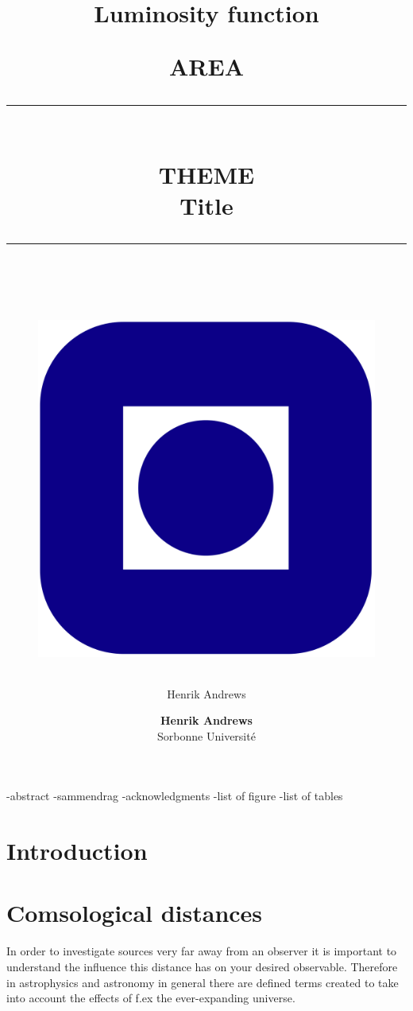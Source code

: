 \documentclass[11pt]{article}
\title{Luminosity function}
\author{Henrik Andrews}
\newcommand{\HRule}[1]{\rule{\linewidth}{#1}}
\begin{document}
\title{ \normalsize \textsc{AREA}
	\\ [2.0cm]
	\HRule{0.5pt} \\
	\LARGE \textbf{\uppercase{Theme}}		
	\\ Title\\
	\HRule{2pt} \\ [0.5cm]		
	\vspace{6cm}
	\begin{figure}[htp]
    \centering
    \includegraphics[width=.2\textwidth]{Logo-Ntnu.svg.png}
    \end{figure}
	}

\author{
    \normalsize 
	\textbf{Henrik Andrews } \\
	Sorbonne Université \\ 
}

\maketitle
\setcounter{page}{ 0 }

\newpage

\pagestyle{fancy}
\fancyhf{}
\setlength\headheight{12pt}
\setcounter{page}{1}


\maketitle
-abstract 
-sammendrag
-acknowledgments
-list of figure
-list of tables


\section{Introduction}

\section{Comsological distances}
In order to investigate sources very far away from an observer it is important to understand the influence this distance has on your desired observable. Therefore in astrophysics and astronomy in general there are defined terms created to take into account the effects of f.ex the ever-expanding universe. 
\end{document}
